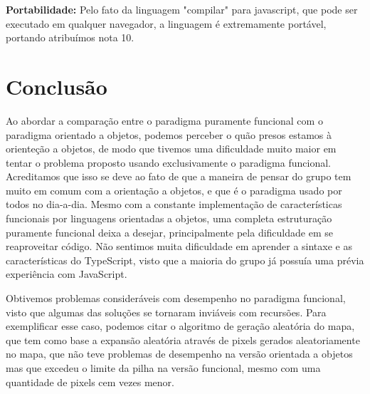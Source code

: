 \documentclass[rel_mlp]{iiufrgs}
\numberwithin{figure}{chapter}
\begin{document}
\textbf{Portabilidade:} Pelo fato da linguagem "compilar" para javascript, que pode ser executado em qualquer navegador, a linguagem é extremamente portável, portando atribuímos nota 10.





%
\chapter{Conclusão}

Ao abordar a comparação entre o paradigma puramente funcional com o paradigma orientado a objetos, podemos perceber o quão presos estamos à orienteção a objetos, de modo que tivemos uma dificuldade muito maior em tentar o problema proposto usando exclusivamente o paradigma funcional. Acreditamos que isso se deve ao fato de que a maneira de pensar do grupo tem muito em comum com a orientação a objetos, e que é o paradigma usado por todos no dia-a-dia. Mesmo com a constante implementação de características funcionais por linguagens orientadas a objetos, uma completa estruturação puramente funcional deixa a desejar, principalmente pela dificuldade em se reaproveitar código. Não sentimos muita dificuldade em aprender a sintaxe e as características do TypeScript, visto que a maioria do grupo já possuía uma prévia experiência com JavaScript.

Obtivemos problemas consideráveis com desempenho no paradigma funcional, visto que algumas das soluções se tornaram inviáveis com recursões. Para exemplificar esse caso, podemos citar o algoritmo de geração aleatória do mapa, que tem como base a expansão aleatória através de pixels gerados aleatoriamente no mapa, que não teve problemas de desempenho na versão orientada a objetos mas que excedeu o limite da pilha na versão funcional, mesmo com uma quantidade de pixels cem vezes menor.


%

%




\end{document}

